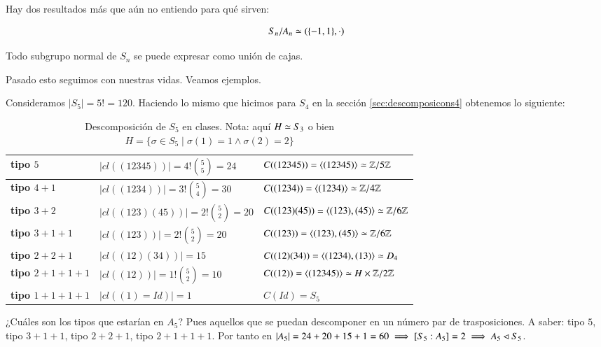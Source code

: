 Hay dos resultados más que aún no entiendo para qué sirven:

\begin{pro}
	\begin{align*}
		S_n / A_n \simeq (\{-1, 1\}, \cdot)
	\end{align*}
\end{pro}

\begin{pro}
	Todo subgrupo normal de $S_n$ se puede expresar como unión de cajas.
\end{pro}

Pasado esto seguimos con nuestras vidas. Veamos ejemplos.

\begin{ej}
	Consideramos $|S_5| = 5! = 120$. Haciendo lo mismo que hicimos para $S_4$ en la sección \ref{sec:descomposicons4} obtenemos lo siguiente:
	\begin{table}[h]
		\centering
		{\renewcommand{\arraystretch}{1.3}
		\begin{tabular}{|l|l|l|}
			\hline
			\textbf{tipo $5$}       & $|cl((12345))| = 4! \binom{5}{5} = 24$   & $C((12345)) = \langle(12345)\rangle \simeq \mathbb{Z}/5\mathbb{Z}$       \\ \hline
			\textbf{tipo $4+1$}     & $|cl((1234))| = 3! \binom{5}{4} = 30$    & $C((1234)) = \langle(1234)\rangle \simeq \mathbb{Z}/4\mathbb{Z}$         \\ \hline
			\textbf{tipo $3+2$}     & $|cl((123)(45))| = 2! \binom{5}{2} = 20$ & $C((123)(45)) = \langle(123),(45)\rangle \simeq \mathbb{Z}/6\mathbb{Z}$  \\ \hline
			\textbf{tipo $3+1+1$}   & $|cl((123))| = 2! \binom{5}{2} = 20$     & $C((123)) = \langle(123),(45)\rangle \simeq \mathbb{Z}/6\mathbb{Z}$      \\ \hline
			\textbf{tipo $2+2+1$}   & $|cl((12)(34))| = 15$                    & $C((12)(34)) = \langle(1234),(13)\rangle \simeq D_4$     \\ \hline
			\textbf{tipo $2+1+1+1$} & $|cl((12))| = 1! \binom{5}{2} = 10$      & $C((12)) = \langle(12345)\rangle \simeq H \times \mathbb{Z}/2\mathbb{Z}$ \\ \hline
			\textbf{tipo $1+1+1+1$} & $|cl((1) = Id)| = 1$                     & $C(Id) = S_5$                                   \\ \hline
		\end{tabular}}
		\caption{Descomposición de $S_5$ en clases. Nota: aquí $H \simeq S_3$ o bien $H = \{\sigma \in S_5 \mid \sigma(1) = 1 \land \sigma(2) = 2\}$}
		\label{fig:descomposicons5}
	\end{table}

	¿Cuáles son los tipos que estarían en $A_5$? Pues aquellos que se puedan descomponer en un número par de trasposiciones. A saber: tipo $5$, tipo $3+1+1$, tipo $2+2+1$, tipo $2+1+1+1$. Por tanto en $|A_5| = 24 + 20 + 15 + 1 = 60 \implies [S_5:A_5] = 2 \implies A_5 \lhd S_5$.
\end{ej}

